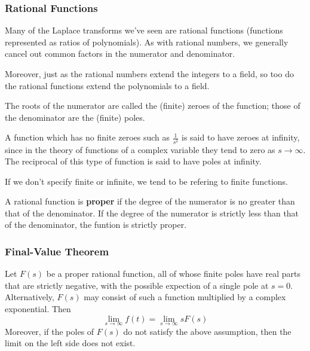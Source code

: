 \documentclass[12pt]{article}
\begin{document}
\subsubsection{Rational Functions}
Many of the Laplace transforms we've seen are rational functions (functions represented as ratios of polynomials). As with rational numbers, we generally cancel out common factors in the numerator and denominator.

Moreover, just as the rational numbers extend the integers to a field, so too do the rational functions extend the polynomials to a field.

The roots of the numerator are called the (finite) zeroes of the function; those of the denominator are the (finite) poles.

A function which has no finite zeroes such as $\frac{1}{s^2}$ is said to have zeroes at infinity, since in the theory of functions of a complex variable they tend to zero as $s\to\infty$. The reciprocal of this type of function is said to have poles at infinity.

If we don't specify finite or infinite, we tend to be refering to finite functions.

A rational function is {\bf proper} if the degree of the numerator is no greater than that of the denominator. If the degree of the numerator is strictly less than that of the denominator, the funtion is strictly proper.

\subsubsection{Final-Value Theorem}
Let $F(s)$ be a proper rational function, all of whose finite poles have real parts that are strictly negative, with the possible expection of a single pole at $s = 0$. Alternatively, $F(s)$ may consist of such a function multiplied by a complex exponential. Then \[ \lim_{s\to\infty} f(t) = \lim_{s\to\infty} sF(s) \] Moreover, if the poles of $F(s)$ do not satisfy the above assumption, then the limit on the left side does not exist.
\end{document}

